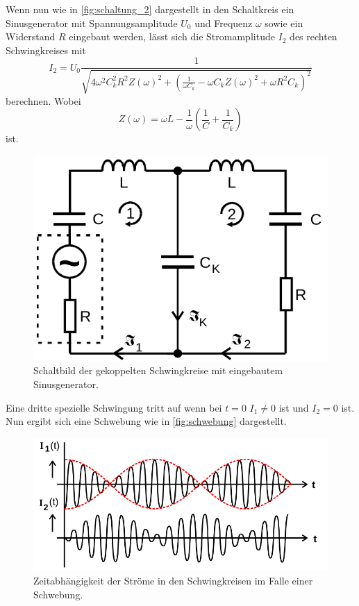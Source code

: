 Wenn nun wie in \autoref{fig:schaltung_2} dargestellt in den Schaltkreis ein Sinusgenerator mit Spannungsamplitude $U_0$ und Frequenz $\omega$ sowie ein Widerstand $R$ eingebaut werden, lässt sich die Stromamplitude $I_2$ des rechten Schwingkreises mit 
\begin{equation}
    \label{eq:stromamplitude}
    I_2 = U_0 \frac{1}{\sqrt{4 \omega^2 C_k^2 R^2 Z(\omega)^2 + \left( \frac{1}{\omega C_k} - \omega C_k Z(\omega)^2 + \omega R^2 C_k \right)^2 }}
\end{equation}
berechnen. Wobei 
\begin{equation}
    Z(\omega) = \omega L - \frac{1}{\omega} \left( \frac{1}{C} + \frac{1}{C_k} \right)
\end{equation}
ist. \cite{V355}
\begin{figure}[h!]
    \centering
    \includegraphics[width=\textwidth/3]{images/schaltung_2.png}
    \caption{Schaltbild der gekoppelten Schwingkreise mit eingebautem Sinusgenerator. \cite{V355}}
    \label{fig:schaltung_2}
\end{figure}

Eine dritte spezielle Schwingung tritt auf wenn bei $t=0$ $I_1 \neq 0$ ist und $I_2 = 0$ ist. Nun ergibt sich eine Schwebung wie in \autoref{fig:schwebung} dargestellt.
\begin{figure}[h!]
    \centering
    \includegraphics[width=\textwidth/2]{images/schwebung.png}
    \caption{Zeitabhängigkeit der Ströme in den Schwingkreisen im Falle einer Schwebung. \cite{V355}}
    \label{fig:schwebung}
\end{figure}

